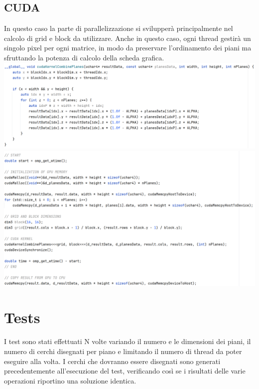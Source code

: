 \documentclass[11pt]{article}
\begin{document}
    \subsection{CUDA}\label{subsec:cuda}
    In questo caso la parte di parallelizzazione si svilupperà principalmente nel calcolo di grid e block da utilizzare.
    Anche in questo caso, ogni thread gestirà un singolo pixel per ogni matrice, in modo da preservare
    l'ordinamento dei piani ma sfruttando la potenza di calcolo della scheda grafica.
    \includegraphics[width=\textwidth]{../documentation/img/code (3)}
    \includegraphics[width=\textwidth]{../documentation/img/code (4)}

    \section{Tests}\label{sec:tests}
    I test sono stati effettuati N volte variando il numero e le dimensioni dei piani, il numero di cerchi disegnati
    per piano e limitando il numero di thread da poter eseguire alla volta.
    I cerchi che dovranno essere disegnati sono generati precedentemente all'esecuzione del test, verificando
    così se i risultati delle varie operazioni riportino una soluzione identica.
\end{document}
